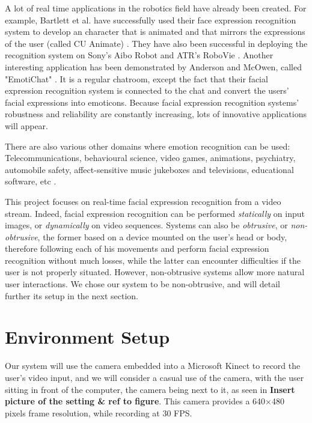 \noindent A lot of real time applications in the robotics field have already been created. For example, Bartlett et al. have successfully used their face expression recognition system to develop an character that is animated and that mirrors the expressions of the user (called CU Animate) \cite{BAR03}. They have also been successful in deploying the recognition system on Sony's Aibo Robot and ATR's RoboVie \cite{BAR03}. Another interesting application has been demonstrated by Anderson and McOwen, called "EmotiChat" \cite{AND06}. It is a regular chatroom, except the fact that their facial expression recognition system is connected to the chat and convert the users' facial expressions into emoticons. Because facial expression recognition systems' robustness and reliability are constantly increasing, lots of innovative applications will appear.
\newline

\noindent There are also various other domains where emotion recognition can be used: Telecommunications, behavioural science, video games, animations, psychiatry, automobile safety, affect-sensitive music jukeboxes and televisions, educational software, etc \cite{BET12}.
\newline

\noindent This project focuses on real-time facial expression recognition from a video stream. Indeed, facial expression recognition can be performed \textit{statically} on input images, or \textit{dynamically} on video sequences. Systems can also be \textit{obtrusive}, or \textit{non-obtrusive}, the former based on a device mounted on the user's head or body, therefore following each of his movements and perform facial expression recognition without much losses, while the latter can encounter difficulties if the user is not properly situated. However, non-obtrusive systems allow more natural user interactions. We chose our system to be non-obtrusive, and will detail further its setup in the next section.
\newline

\section{Environment Setup}

\vspace{\baselineskip}
\noindent Our system will use the camera embedded into a Microsoft Kinect to record the user's video input, and we will consider a casual use of the camera, with the user sitting in front of the computer, the camera being next to it, as seen in \textbf{\color{red} Insert picture of the setting \& ref to figure}. This camera provides a 640$\times$480 pixels frame resolution, while recording at 30 FPS.
\newline

